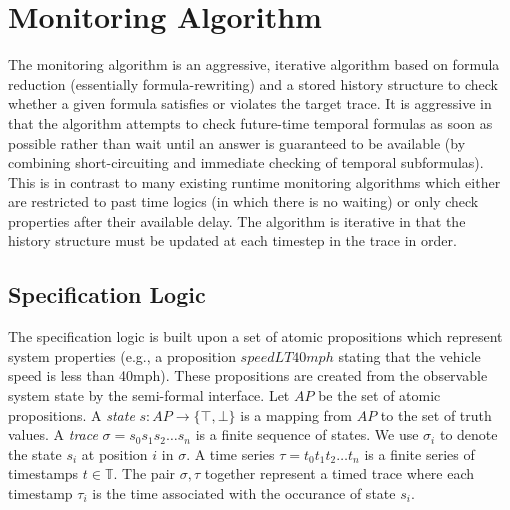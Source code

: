 \documentclass[]{llncs}
\begin{document}





\section{Monitoring Algorithm}
The monitoring algorithm is an aggressive, iterative algorithm based on formula reduction (essentially formula-rewriting) and a stored history structure to check whether a given formula satisfies or violates the target trace. 
It is aggressive in that the algorithm attempts to check future-time temporal formulas as soon as possible rather than wait until an answer is guaranteed to be available (by combining short-circuiting and immediate checking of temporal subformulas).
This is in contrast to many existing runtime monitoring algorithms which either are restricted to past time logics (in which there is no waiting) or only check properties after their available delay. %
The algorithm is iterative in that the history structure must be updated at each timestep in the trace in order. 

\subsection{Specification Logic}
The specification logic is built upon a set of atomic propositions which represent system properties (e.g., a proposition $speedLT40mph$ stating that the vehicle speed is less than 40mph). These propositions are created from the observable system state by the semi-formal interface.
Let $AP$ be the set of atomic propositions. 
A \emph{state} $s: AP \rightarrow \{\top,\bot\}$ is a mapping from $AP$ to the set of truth values. A \emph{trace} $\sigma = s_0s_1s_2\ldots{}s_n$ is a finite sequence of states. We use $\sigma_i$ to denote the state $s_i$ at position $i$ in $\sigma$.
%
A time series $\tau = t_0t_1t_2\ldots{}t_n$ is a finite series of timestamps $t\in\mathbb{T}$. The pair $\sigma, \tau$ together represent a timed trace where each timestamp $\tau_i$ is the time associated with the occurance of state $s_i$.
%
\end{document}
